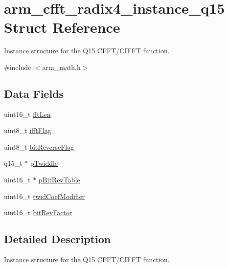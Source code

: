 \hypertarget{structarm__cfft__radix4__instance__q15}{\section{arm\-\_\-cfft\-\_\-radix4\-\_\-instance\-\_\-q15 Struct Reference}
\label{structarm__cfft__radix4__instance__q15}
}


Instance structure for the Q15 C\-F\-F\-T/\-C\-I\-F\-F\-T function.  




{\ttfamily \#include $<$arm\-\_\-math.\-h$>$}

\subsection*{Data Fields}
\begin{DoxyCompactItemize}
\item 
uint16\-\_\-t \hyperlink{structarm__cfft__radix4__instance__q15_ab8db3bbe7c61e6bb8ca2a55e3446e11a}{fft\-Len}
\item 
uint8\-\_\-t \hyperlink{structarm__cfft__radix4__instance__q15_ad6ca6e223f986ebfd94c5ee1e410aa73}{ifft\-Flag}
\item 
uint8\-\_\-t \hyperlink{structarm__cfft__radix4__instance__q15_a09a221a818c6d0e064557a99e2fe9a8b}{bit\-Reverse\-Flag}
\item 
q15\-\_\-t $\ast$ \hyperlink{structarm__cfft__radix4__instance__q15_aa8c837c05b2c910342ab8f171d30dc02}{p\-Twiddle}
\item 
uint16\-\_\-t $\ast$ \hyperlink{structarm__cfft__radix4__instance__q15_a46a2fb328199897af100fea0bfdf59aa}{p\-Bit\-Rev\-Table}
\item 
uint16\-\_\-t \hyperlink{structarm__cfft__radix4__instance__q15_afe772e5b5001c9d8e85032115a8df5bf}{twid\-Coef\-Modifier}
\item 
uint16\-\_\-t \hyperlink{structarm__cfft__radix4__instance__q15_a33386d95319dc3ee7097b3a8e52e01ec}{bit\-Rev\-Factor}
\end{DoxyCompactItemize}


\subsection{Detailed Description}
Instance structure for the Q15 C\-F\-F\-T/\-C\-I\-F\-F\-T function. 

